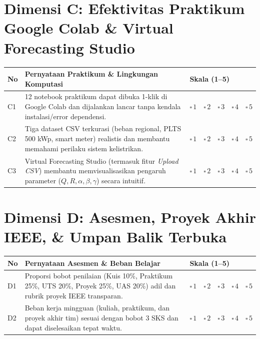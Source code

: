 \documentclass[10.5pt,a4paper]{article}
\newcommand{\hdr}[1]{\cellcolor{headerrow}\color{white}\textbf{#1}}
\newcommand{\likert}{$\square\,1 \quad \square\,2 \quad \square\,3 \quad \square\,4 \quad \square\,5$}
\begin{document}
\section{Dimensi C: Efektivitas Praktikum Google Colab \& Virtual Forecasting Studio}
{\small
\renewcommand{\arraystretch}{1.28}
\begin{tabular}{|p{0.6cm}|p{10.5cm}|p{4.8cm}|}
\hline
\hdr{No} & \hdr{Pernyataan Praktikum \& Lingkungan Komputasi} & \hdr{Skala (1--5)} \\ \hline
C1 & 12 notebook praktikum dapat dibuka 1-klik di Google Colab dan dijalankan lancar tanpa kendala instalasi/error dependensi. & \likert \\ \hline
C2 & Tiga dataset CSV terkurasi (beban regional, PLTS 500 kWp, smart meter) realistis dan membantu memahami perilaku sistem kelistrikan. & \likert \\ \hline
C3 & Virtual Forecasting Studio (termasuk fitur \textit{Upload CSV}) membantu memvisualisasikan pengaruh parameter ($Q, R, \alpha, \beta, \gamma$) secara intuitif. & \likert \\ \hline
\end{tabular}
}

\section{Dimensi D: Asesmen, Proyek Akhir IEEE, \& Umpan Balik Terbuka}
{\small
\renewcommand{\arraystretch}{1.28}
\begin{tabular}{|p{0.6cm}|p{10.5cm}|p{4.8cm}|}
\hline
\hdr{No} & \hdr{Pernyataan Asesmen \& Beban Belajar} & \hdr{Skala (1--5)} \\ \hline
D1 & Proporsi bobot penilaian (Kuis 10\%, Praktikum 25\%, UTS 20\%, Proyek 25\%, UAS 20\%) adil dan rubrik proyek IEEE transparan. & \likert \\ \hline
D2 & Beban kerja mingguan (kuliah, praktikum, dan proyek akhir tim) sesuai dengan bobot 3 SKS dan dapat diselesaikan tepat waktu. & \likert \\ \hline
\end{tabular}
}
\end{document}
